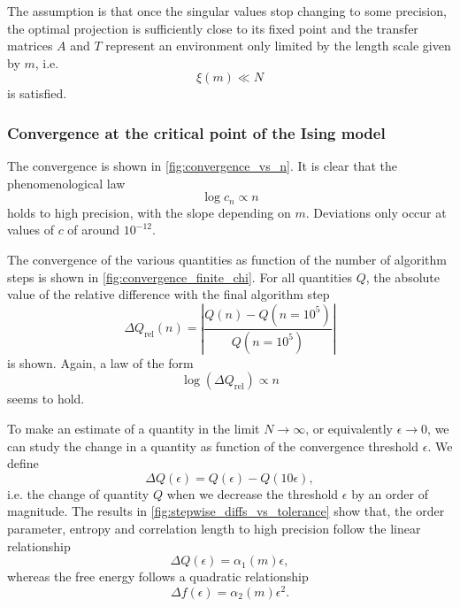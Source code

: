 The assumption is that once the singular values stop changing to some precision, the optimal projection is sufficiently
close to its fixed point and the transfer matrices $A$ and $T$ represent an environment only limited by the length scale
given by $m$, i.e.
\begin{equation}
  \xi(m) \ll N
\end{equation}
is satisfied.

\subsubsection{Convergence at the critical point of the Ising model}
The convergence is shown in \autoref{fig:convergence_vs_n}. It is clear that the
phenomenological law
\begin{equation}\label{eq:convergence_vs_n_semilogarithmic_law}
  \log c_n \propto n
\end{equation}
holds to high precision, with the slope depending on $m$.
Deviations only occur at values of $c$ of around $10^{-12}$.

The convergence of the various quantities as function of the number of algorithm steps is shown in
\autoref{fig:convergence_finite_chi}. For all quantities $Q$, the absolute value of the relative difference
with the final algorithm step
\begin{equation}\label{eq:abs_rel_diff}
  \Delta Q_{\text{rel}}(n) = \left| \frac{Q(n) - Q(n = 10^5)}{Q(n = 10^5)} \right|
\end{equation}
is shown. Again, a law of the form
\begin{equation}\label{eq:abs_rel_diff_vs_n_semilogarithmic_law}
  \log(\Delta Q_{\text{rel}}) \propto n
\end{equation}
seems to hold.

To make an estimate of a quantity in the limit $N \to \infty$, or equivalently $\epsilon \to 0$,
we can study the change in a quantity as function of the convergence threshold $\epsilon$. We define
\begin{equation}\label{eq:stepwise_difference_epsilon}
  \Delta Q(\epsilon) = Q(\epsilon) - Q(10\epsilon),
\end{equation}
i.e. the change of quantity $Q$ when we decrease the threshold $\epsilon$ by an order of magnitude. The results in
\autoref{fig:stepwise_diffs_vs_tolerance} show that, the order parameter, entropy and correlation length
to high precision follow the linear relationship
\begin{equation}\label{eq:stepwise_difference_linear}
  \Delta Q(\epsilon) = \alpha_1(m) \epsilon,
\end{equation}
whereas the free energy follows a quadratic relationship
\begin{equation}\label{eq:stepwise_difference_quadratic}
  \Delta f(\epsilon) = \alpha_2(m) \epsilon^2.
\end{equation}

